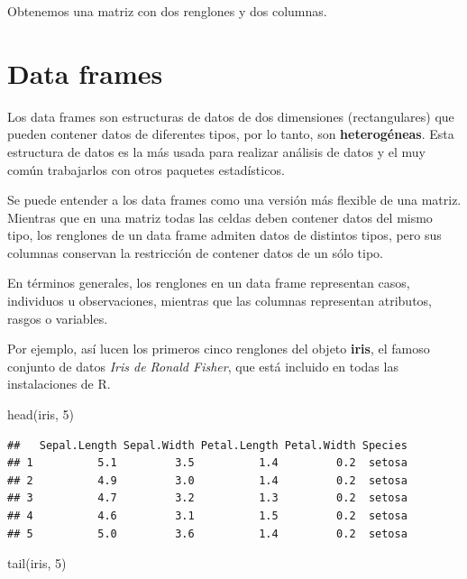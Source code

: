 \documentclass[
]{book}
\newenvironment{Shaded}{\begin{snugshade}}{\end{snugshade}}
\newcommand{\DecValTok}[1]{\textcolor[rgb]{0.00,0.00,0.81}{#1}}
\newcommand{\FunctionTok}[1]{\textcolor[rgb]{0.00,0.00,0.00}{#1}}
\newcommand{\NormalTok}[1]{#1}
\begin{document}
Obtenemos una matriz con dos renglones y dos columnas.

\hypertarget{data-frames}{%
\section{Data frames}\label{data-frames}}

Los data frames son estructuras de datos de dos dimensiones (rectangulares) que pueden contener datos de diferentes tipos, por lo tanto, son \textbf{heterogéneas}. Esta estructura de datos es la más usada para realizar análisis de datos y el muy común trabajarlos con otros paquetes estadísticos.

Se puede entender a los data frames como una versión más flexible de una matriz. Mientras que en una matriz todas las celdas deben contener datos del mismo tipo, los renglones de un data frame admiten datos de distintos tipos, pero sus columnas conservan la restricción de contener datos de un sólo tipo.

En términos generales, los renglones en un data frame representan casos, individuos u observaciones, mientras que las columnas representan atributos, rasgos o variables.

Por ejemplo, así lucen los primeros cinco renglones del objeto \textbf{iris}, el famoso conjunto de datos \emph{Iris de Ronald Fisher}, que está incluido en todas las instalaciones de R.

\begin{Shaded}
\begin{Highlighting}[]
\FunctionTok{head}\NormalTok{(iris, }\DecValTok{5}\NormalTok{)}
\end{Highlighting}
\end{Shaded}

\begin{verbatim}
##   Sepal.Length Sepal.Width Petal.Length Petal.Width Species
## 1          5.1         3.5          1.4         0.2  setosa
## 2          4.9         3.0          1.4         0.2  setosa
## 3          4.7         3.2          1.3         0.2  setosa
## 4          4.6         3.1          1.5         0.2  setosa
## 5          5.0         3.6          1.4         0.2  setosa
\end{verbatim}

\begin{Shaded}
\begin{Highlighting}[]
\FunctionTok{tail}\NormalTok{(iris, }\DecValTok{5}\NormalTok{)}
\end{Highlighting}
\end{Shaded}
\end{document}
